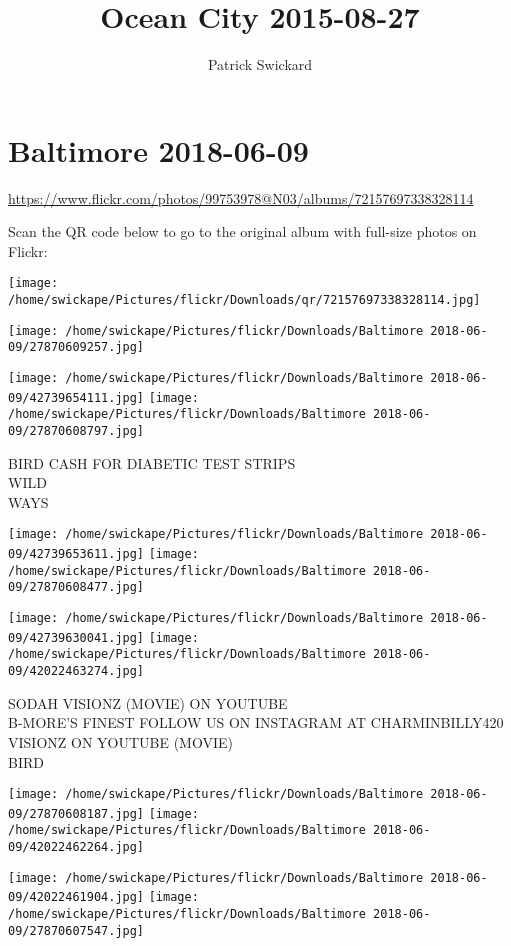 \documentclass[10pt,letterpaper]{article}
\title{Ocean City 2015-08-27}
\author{Patrick Swickard}
\date{}
\begin{document}
\section*{Baltimore 2018-06-09}

\url{https://www.flickr.com/photos/99753978@N03/albums/72157697338328114}

Scan the QR code below to go to the original album with full-size photos on Flickr:

\texttt{[image: /home/swickape/Pictures/flickr/Downloads/qr/72157697338328114.jpg]}
\pagebreak

\texttt{[image: /home/swickape/Pictures/flickr/Downloads/Baltimore 2018-06-09/27870609257.jpg]}

\vspace{0.25in}
\texttt{[image: /home/swickape/Pictures/flickr/Downloads/Baltimore 2018-06-09/42739654111.jpg]}
\texttt{[image: /home/swickape/Pictures/flickr/Downloads/Baltimore 2018-06-09/27870608797.jpg]}

BIRD CASH FOR DIABETIC TEST STRIPS\\
WILD\\
WAYS
\pagebreak

\texttt{[image: /home/swickape/Pictures/flickr/Downloads/Baltimore 2018-06-09/42739653611.jpg]}
\texttt{[image: /home/swickape/Pictures/flickr/Downloads/Baltimore 2018-06-09/27870608477.jpg]}

\texttt{[image: /home/swickape/Pictures/flickr/Downloads/Baltimore 2018-06-09/42739630041.jpg]}
\texttt{[image: /home/swickape/Pictures/flickr/Downloads/Baltimore 2018-06-09/42022463274.jpg]}

SODAH VISIONZ (MOVIE) ON YOUTUBE\\
B{-}MORE'S FINEST FOLLOW US ON INSTAGRAM AT CHARMINBILLY420\\
VISIONZ ON YOUTUBE (MOVIE)\\
BIRD
\pagebreak

\texttt{[image: /home/swickape/Pictures/flickr/Downloads/Baltimore 2018-06-09/27870608187.jpg]}
\texttt{[image: /home/swickape/Pictures/flickr/Downloads/Baltimore 2018-06-09/42022462264.jpg]}

\texttt{[image: /home/swickape/Pictures/flickr/Downloads/Baltimore 2018-06-09/42022461904.jpg]}
\texttt{[image: /home/swickape/Pictures/flickr/Downloads/Baltimore 2018-06-09/27870607547.jpg]}
\end{document}
